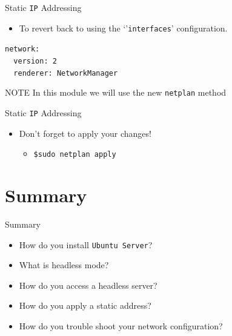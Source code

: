 \documentclass{beamer}
\begin{document}
\begin{frame}{Static \texttt{IP} Addressing}
  \begin{itemize}
    \item To revert back to using the `'\texttt{interfaces}' configuration.
  \end{itemize}
  \begin{center}
    \begin{minipage}{9cm}
      \begin{block}{}
        \texttt{network:\\
        ~~version: 2\\
        ~~renderer: NetworkManager\\}
      \end{block}
    \end{minipage}
  \end{center}
  \begin{block}{NOTE}
    In this module we will use the new \texttt{netplan} method
  \end{block}
\end{frame}

\begin{frame}{Static \texttt{IP} Addressing}
  \begin{itemize}
    \item Don't forget to apply your changes!
    \begin{itemize}
      \item \texttt{\$sudo netplan apply}
    \end{itemize}
  \end{itemize}
\end{frame}

\section*{Summary}

\begin{frame}{Summary}
  \begin{itemize}
    \item How do you install \texttt{Ubuntu Server}?
    \item What is headless mode?
    \item How do you access a headless server?
    \item How do you apply a static address?
    \item How do you trouble shoot your network configuration?
  \end{itemize}
\end{frame}
\end{document}
